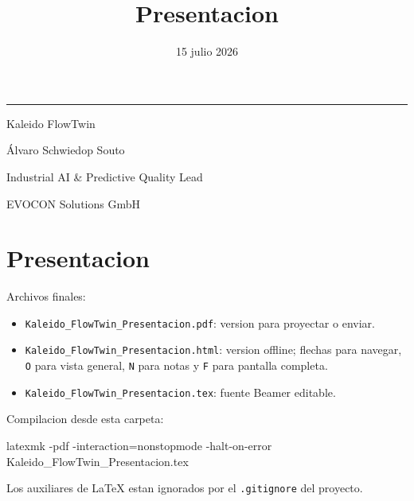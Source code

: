 \documentclass[
  spanish,
  10pt,
  a4paper,
]{article}
\title{Presentacion}
\author{}
\date{15 julio 2026}
\makeatletter
\newenvironment{Shaded}{}{}
\newcommand{\FunctionTok}[1]{\textcolor[rgb]{0.02,0.16,0.49}{#1}}
\newcommand{\NormalTok}[1]{#1}
\newcommand{\OperatorTok}[1]{\textcolor[rgb]{0.40,0.40,0.40}{#1}}
\providecommand{\tightlist}{%
  \setlength{\itemsep}{0pt}\setlength{\parskip}{0pt}}
\renewcommand{\maketitle}{%
  \hypersetup{pageanchor=false}
  \begin{titlepage}
    \pagecolor{KaleidoNavy}
    \color{white}
    \vspace*{1.4cm}
    {\color{KaleidoCyan}\rule{2.4cm}{2.5pt}\par}
    \vspace{1.1cm}
    {\Huge\bfseries\@title\par}
    \vspace{0.65cm}
    {\Large\color{KaleidoMint}Kaleido FlowTwin\par}
    \vfill
    {\large Álvaro Schwiedop Souto\par}
    \vspace{0.15cm}
    {\normalsize\color{KaleidoMint}Industrial AI \& Predictive Quality Lead\par}
    \vspace{0.15cm}
    {\normalsize\color{KaleidoMint}EVOCON Solutions GmbH\par}
    \vspace{0.25cm}
    {\normalsize\color{KaleidoMint}\@date\par}
  \end{titlepage}
  \hypersetup{pageanchor=true}
  \nopagecolor
  \color{black}
}
\makeatother
\begin{document}
\maketitle

{
\setcounter{tocdepth}{3}
\tableofcontents
}
\section{Presentacion}\label{presentacion}

Archivos finales:

\begin{itemize}
\tightlist
\item
  \texttt{Kaleido\_FlowTwin\_Presentacion.pdf}: version para proyectar o
  enviar.
\item
  \texttt{Kaleido\_FlowTwin\_Presentacion.html}: version offline;
  flechas para navegar, \texttt{O} para vista general, \texttt{N} para
  notas y \texttt{F} para pantalla completa.
\item
  \texttt{Kaleido\_FlowTwin\_Presentacion.tex}: fuente Beamer editable.
\end{itemize}

Compilacion desde esta carpeta:

\begin{Shaded}
\begin{Highlighting}[]
\NormalTok{latexmk }\OperatorTok{{-}}\NormalTok{pdf }\OperatorTok{{-}}\NormalTok{interaction}\OperatorTok{=}\NormalTok{nonstopmode }\OperatorTok{{-}}\NormalTok{halt{-}on{-}error Kaleido\_FlowTwin\_Presentacion}\OperatorTok{.}\FunctionTok{tex}
\end{Highlighting}
\end{Shaded}

Los auxiliares de LaTeX estan ignorados por el \texttt{.gitignore} del
proyecto.
\end{document}
